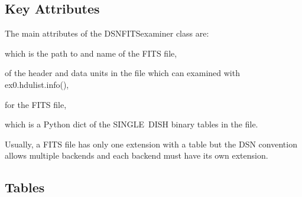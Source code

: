 \documentclass[letterpaper,11pt]{book}
\begin{document}
\subsection{Key Attributes}

The main attributes of the {\ttfamily DSNFITSexaminer} class are:
\begin{description}\itemsep0pt \parskip0pt 
\item[{\ttfamily file}] which is the path to and name of the FITS file,
\item[{\ttfamily hdulist}] of the header and data units in the file which can
examined with {\ttfamily ex0.hdulist.info()},
\item[{\ttfamily header}] for the FITS file,
\item[{\ttfamily tables}] which is a Python {\ttfamily dict} of the SINGLE~DISH
binary tables in the file.
\end{description}
Usually, a FITS file has only one extension with a table but the DSN convention
allows multiple backends and each backend must have its own extension.

\subsection{Tables}
\end{document}
